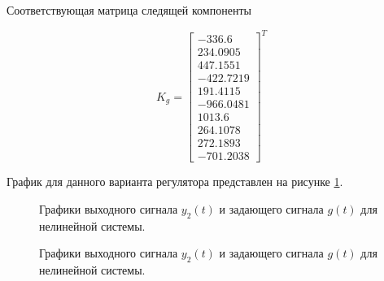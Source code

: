 Соответствующая матрица следящей компоненты

$$K_g = \begin{bmatrix}
	-336.6\\	234.0905\\	447.1551\\	-422.7219\\	191.4115\\	-966.0481\\	1013.6\\	264.1078\\	272.1893\\	-701.2038
\end{bmatrix}^T$$

График для данного варианта регулятора представлен на рисунке \ref{5_g_nonlin_1}.
\begin{figure}[!h]
	\caption{Графики выходного сигнала $y_2(t)$ и задающего сигнала $g(t)$ для нелинейной системы.}
	\label{5_g_nonlin_1}
\end{figure}

\begin{figure}[!h]
	\caption{Графики выходного сигнала $y_2(t)$ и задающего сигнала $g(t)$ для нелинейной системы.}
	\label{5_g_nonlin_2}
\end{figure}

